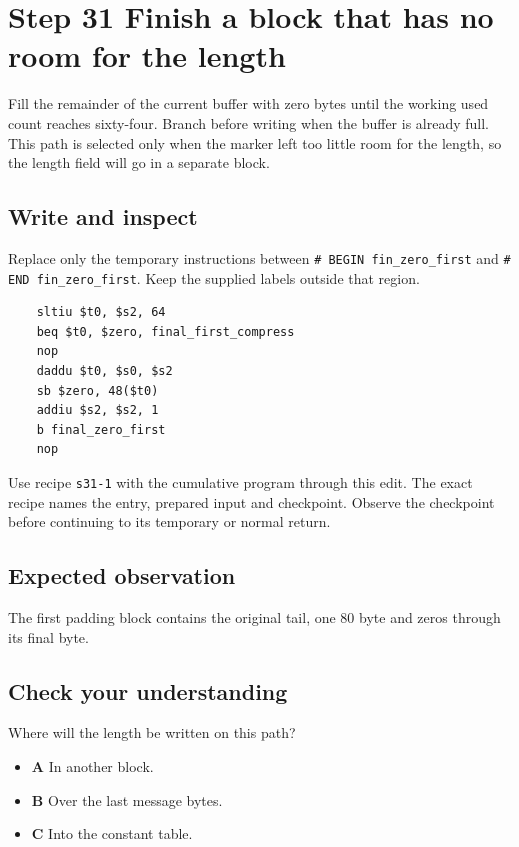 \section{Step 31 Finish a block that has no room for the length}\label{sha-s31}

Fill the remainder of the current buffer with zero bytes until the working used count reaches sixty-four. Branch before writing when the buffer is already full. This path is selected only when the marker left too little room for the length, so the length field will go in a separate block.

\subsection{Write and inspect}
Replace only the temporary instructions between \texttt{\# BEGIN fin\_zero\_first} and \texttt{\# END fin\_zero\_first}. Keep the supplied labels outside that region.

\begin{verbatim}
    sltiu $t0, $s2, 64
    beq $t0, $zero, final_first_compress
    nop
    daddu $t0, $s0, $s2
    sb $zero, 48($t0)
    addiu $s2, $s2, 1
    b final_zero_first
    nop
\end{verbatim}

Use recipe \texttt{s31-1} with the cumulative program through this edit. The exact recipe names the entry, prepared input and checkpoint. Observe the checkpoint before continuing to its temporary or normal return.

\subsection{Expected observation}
The first padding block contains the original tail, one 80 byte and zeros through its final byte.

\subsection{Check your understanding}
Where will the length be written on this path?

\begin{itemize}
\item \textbf{A} In another block.
\item \textbf{B} Over the last message bytes.
\item \textbf{C} Into the constant table.
\end{itemize}
